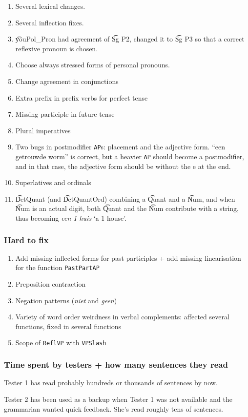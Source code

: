 \begin{enumerate}
\def\labelenumi{\arabic{enumi}.}
\itemsep1pt\parskip0pt
\item
  Several lexical changes.
\item
  Several inflection fixes.
\item
  \t{youPol\_Pron} had agreement of \t{Sg P2}, changed it to \t{Sg P3} so that a
  correct reflexive pronoun is chosen.
\item
  Choose always stressed forms of personal pronouns.
\item
  Change agreement in conjunctions
\item
  Extra prefix in prefix verbs for perfect tense
\item
  Missing participle in future tense
\item
  Plural imperatives
\item
  Two bugs in postmodifier \texttt{AP}s: placement and the adjective
  form. ``een getrouwde worm'' is correct, but a heavier \texttt{AP}
  should become a postmodifier, and in that case, the adjective form
  should be without the e at the end.
\item
  Superlatives and ordinals
\item \t{DetQuant} (and \t{DetQuantOrd}) combining a \t{Quant} and a
  \t{Num}, and when \t{Num} is an actual digit, both \t{Quant} and the \t{Num}
  contribute with a string, thus becoming \emph{een 1 huis} `a 1
  house'.
\end{enumerate}

\subsubsection{Hard to fix}\label{hard-to-fix}

\begin{enumerate}
\def\labelenumi{\arabic{enumi}.}
\itemsep1pt\parskip0pt
\item
  Add missing inflected forms for past participles + add missing
  linearisation for the function \texttt{PastPartAP}
\item
  Preposition contraction
\item
  Negation patterns (\emph{niet} and \emph{geen})
\item
  Variety of word order weirdness in verbal complements: affected
  several functions, fixed in several functions
\item
  Scope of \texttt{ReflVP} with \texttt{VPSlash}
\end{enumerate}

\subsubsection{Time spent by testers + how many sentences they
read}\label{time-spent-by-testers-how-many-sentences-they-read}

Tester 1 has read probably hundreds or thousands of sentences by now.

Tester 2 has been used as a backup when Tester 1 was not available and the
grammarian wanted quick feedback. She's read roughly tens of sentences.